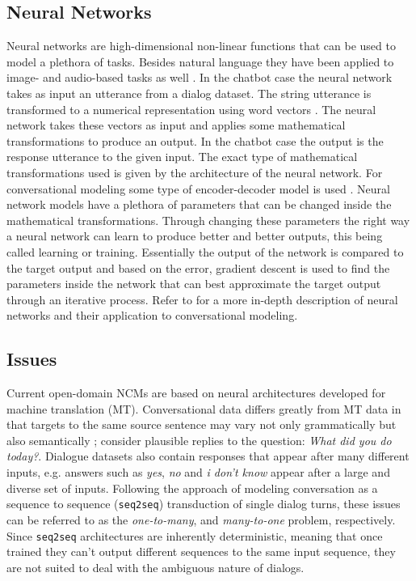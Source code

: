 \documentclass[11pt,a4paper]{article}
\begin{document}
\subsection{Neural Networks}
Neural networks are high-dimensional non-linear functions that can be used to model a plethora of tasks. Besides natural language they have been applied to image- and audio-based tasks as well \cite{Krizhevsky:2012, Van:2016}. In the chatbot case the neural network takes as input an utterance from a dialog dataset. The string utterance is transformed to a numerical representation using word vectors \cite{Mikolov:2013f}. The neural network takes these vectors as input and applies some mathematical transformations to produce an output. In the chatbot case the output is the response utterance to the given input. The exact type of mathematical transformations used is given by the architecture of the neural network. For conversational modeling some type of encoder-decoder model is used \cite{Sutskever:2014}. Neural network models have a plethora of parameters that can be changed inside the mathematical transformations. Through changing these parameters the right way a neural network can learn to produce better and better outputs, this being called learning or training. Essentially the output of the network is compared to the target output and based on the error, gradient descent is used to find the parameters inside the network that can best approximate the target output through an iterative process. Refer to \cite{Csaky:2017} for a more in-depth description of neural networks and their application to conversational modeling.
\subsection{Issues}
Current open-domain NCMs are based on neural architectures developed
for machine translation (MT). Conversational data differs
greatly from MT data in that targets to the same source sentence may vary not
only grammatically but also semantically
\cite{Wei:2017,Tandon:2017}; consider plausible replies to
the question: \textit{What did you do today?}. Dialogue datasets also
contain responses that appear after many different inputs, e.g. answers
such as \textit{yes}, \textit{no} and \textit{i don't
  know} appear after a large and diverse set of inputs.
Following the approach of modeling conversation as a sequence to sequence (\texttt{seq2seq})
\cite{Sutskever:2014} transduction of single dialog turns, these
issues can be referred to as the
\textit{one-to-many}, and \textit{many-to-one} problem, respectively. Since
\texttt{seq2seq} architectures are inherently deterministic, meaning that once trained
they can't output different sequences to the same input sequence, they are not
suited to deal with the ambiguous nature of dialogs.
\end{document}
